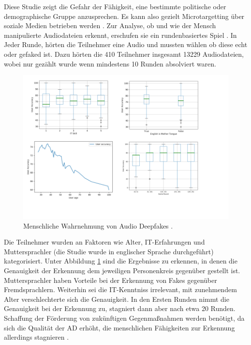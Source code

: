 Diese Studie zeigt die Gefahr der Fähigkeit, eine bestimmte politische oder demographische Gruppe anzusprechen.
Es kann also gezielt Microtargetting über soziale Medien betrieben werden \citep[Vgl.][]{Hancock2021}.
Zur Analyse, ob und wie der Mensch manipulierte Audiodateien erkennt, erschufen sie ein rundenbasiertes Spiel \citep[][]{Mueller2022}.
In Jeder Runde, hörten die Teilnehmer eine Audio und mussten wählen ob diese echt oder gefaked ist.
Dazu hörten die 410 Teilnehmer insgesamt 13229 Audiodateien, wobei nur gezählt wurde wenn mindestens 10 Runden absolviert waren.
\par
\begin{figure}[h]
 \centering
 \includegraphics{Assets/ResultsHumanDetectionDeepFake.png}
 \caption{Menschliche Wahrnehmung von Audio Deepfakes \citep[][]{Mueller2022}.}
 \label{fig:ResultsDetectionDeepfake}
\end{figure}
Die Teilnehmer wurden an Faktoren wie Alter, IT-Erfahrungen und Muttersprachler (die Studie wurde in englischer Sprache durchgeführt) kategorisiert.
Unter Abbildung \ref{fig:ResultsDetectionDeepfake} sind die Ergebnisse zu erkennen, in denen die Genauigkeit der Erkennung dem jeweiligen Personenkreis gegenüber gestellt ist.
Muttersprachler haben Vorteile bei der Erkennung von Fakes gegenüber Fremdsprachlern.
Weiterhin sei die IT-Kenntniss irrelevant, mit zunehmendem Alter verschlechterte sich die Genauigkeit. 
In den Ersten Runden nimmt die Genauigkeit bei der Erkennung zu, stagniert dann aber nach etwa 20 Runden.
Schaffung der Förderung von zukünftigen Gegenmaßnahmen werden benötigt, da sich die Qualität der AD erhöht, die menschlichen Fähigkeiten zur Erkennung allerdings stagnieren \citep[][]{Mueller2022}.
